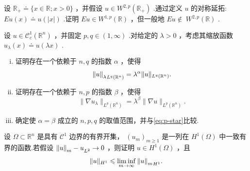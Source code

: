 \begin{rbhw}
设 ${\mathbb{R}}_{ + } \doteq  \{ x \in  \mathbb{R};x > 0\}$ ，并假设 $u \in  {W}^{2,p}\left( {\mathbb{R}}_{ + }\right)$ .通过定义 $u$ 的对称延拓: ${Eu}\left( x\right)  \doteq  u\left( \left| x\right| \right)$ .证明 ${Eu} \in  {W}^{1,p}\left( \mathbb{R}\right)$ ，但一般地 ${Eu} \notin \; {W}^{2,p}\left( \mathbb{R}\right)$ .
\end{rbhw}

\begin{rbhw}
设 $u \in  {\mathcal{C}}_{c}^{1}\left( {\mathbb{R}}^{n}\right)$ ，并固定 $p,q \in  (1,\infty)$ .对给定的 $\lambda  > 0$ ，考虑其缩放函数 ${u}_{\lambda }\left( x\right)  \doteq  u\left( {\lambda x}\right)$ .
\begin{enumerate}[(i)]
    \item 证明存在一个依赖于 $n,q$ 的指数 $\alpha$ ，使得
\[
{\norm{u}_{\lambda }}_{{L}^{q}\left( {\mathbb{R}}^{n}\right) } = {\lambda }^{\alpha }\| u{\| }_{{L}^{q}\left( {\mathbb{R}}^{n}\right) }.
\]
    \item 证明存在一个依赖于 $n,p$ 的指数 $\beta$ ，使得
\[
\| \nabla {u}_{\lambda }{\| }_{{L}^{p}\left( {\mathbb{R}}^{n}\right) } = {\lambda }^{\beta }\| \nabla u{\| }_{{L}^{p}\left( {\mathbb{R}}^{n}\right) }.
\]
    \item  确定使 $\alpha  = \beta$ 成立的 $n,p,q$ 的取值范围，并与\eqref{eq:p-star}比较.
\end{enumerate}
\end{rbhw}

\begin{rbhw}
设 $\Omega  \subset  {\mathbb{R}}^{n}$ 是具有 ${\mathcal{C}}^{1}$ 边界的有界开集， ${\left( {u}_{m}\right) }_{m \geq  1}$ 是一列在 ${H}^{1}\left( \Omega \right)$ 中一致有界的函数.若假设 ${\norm{u}_{m} - u}_{{L}^{2}} \rightarrow  0$ ，则证明 $u \in  {H}^{1}\left( \Omega \right)$ ，且
\[
\| u{\| }_{{H}^{1}} \leqslant  \mathop{\liminf }\limits_{{m \rightarrow  \infty }}{\norm{u}_{m}}_{{H}^{1}}.
\]
\end{rbhw}


